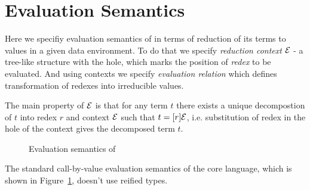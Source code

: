 \section{Evaluation Semantics}
\label{sec:evaluation}

Here we specifiy evaluation semantics of \langname in terms of reduction of
its terms to values in a given data environment. To do that we specify
\emph{reduction context} $\mathcal{E}$ - a tree-like structure with the hole, which
marks the position of \emph{redex} to be evaluated. And using contexts we
specify \emph{evaluation relation} which defines transformation of redexes
into irreducible values.

The main property of $\mathcal{E}$ is that for any term $t$ there exists a unique
decompostion of $t$ into redex $r$ and context $\mathcal{E}$ such that $t =
[r]\mathcal{E}$, i.e. substitution of redex in the hole of the context gives the
decomposed term $t$. 



\begin{figure}[h]
    \footnotesize
    
    \caption{Evaluation semantics of \langname}
    \label{fig:semantics}
\end{figure}
    
The standard call-by-value evaluation semantics of the core language, which
is shown in Figure~\ref{fig:semantics}, doesn't use reified types.